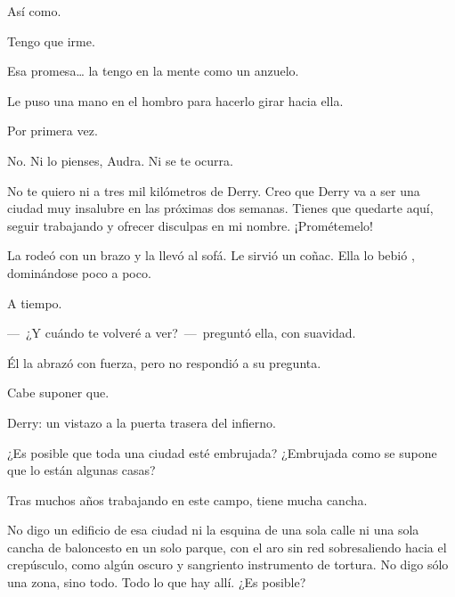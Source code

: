 \sk
Así como. 

\sk
Tengo que irme. 

\sk
Esa promesa\ldots{} la tengo en la mente como un anzuelo. \nb{}

\sk
Le puso una mano en el hombro para hacerlo girar hacia ella. 

\sk
Por primera vez. 

\sk
No. Ni lo pienses, Audra. Ni se te ocurra. 

\sk
No te quiero ni a tres mil kilómetros de
Derry. Creo que Derry va a ser una ciudad muy
insalubre en las próximas dos semanas. Tienes que
quedarte aquí, seguir trabajando y ofrecer
disculpas en mi nombre. ¡Prométemelo!

\sk
La rodeó con un brazo y la llevó al sofá. Le
sirvió un coñac. Ella lo bebió ,
dominándose poco a poco.

\sk
A tiempo. 

\sk
---~¿Y cuándo te volveré a ver?~---~preguntó ella,
con suavidad.

\sk
Él la abrazó con fuerza, pero no respondió a su
pregunta.

\sk
Cabe suponer que. 

\sk
Derry: un vistazo a la puerta trasera del infierno.

\sk
¿Es posible que toda una ciudad esté embrujada?
¿Embrujada como se supone que lo están
algunas casas?

\sk
Tras muchos años trabajando en este campo, tiene mucha cancha. 

\sk
No digo un edificio de esa ciudad ni la esquina
de una sola calle ni una sola cancha de baloncesto
en un solo parque, con el aro sin red
sobresaliendo hacia el crepúsculo, como algún
oscuro y sangriento instrumento de tortura. No
digo sólo una zona, sino todo. Todo lo que hay
allí.
¿Es posible?

